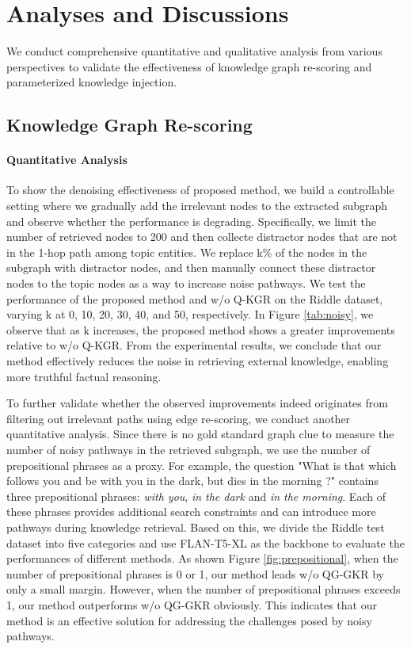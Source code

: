 \documentclass[11pt]{article}
\begin{document}
\section{Analyses and Discussions}
We conduct comprehensive quantitative and qualitative analysis from various perspectives to validate the effectiveness of knowledge graph re-scoring and parameterized knowledge injection.

\subsection{Knowledge Graph Re-scoring}
\paragraph{Quantitative Analysis}

To show the denoising effectiveness of proposed method, we build a controllable setting where we gradually add the irrelevant nodes to the extracted subgraph and observe whether the performance is degrading.
Specifically, we limit the number of retrieved nodes to 200 and then collecte distractor nodes that are not in the 1-hop path among topic entities. 
We replace k\% of the nodes in the subgraph with distractor nodes, and then manually connect these distractor nodes to the topic nodes as a way to increase noise pathways. 
We test the performance of the proposed method and w/o Q-KGR on the Riddle dataset, varying k at 0, 10, 20, 30, 40, and 50, respectively. 
In Figure \ref{tab:noisy}, we observe that as k increases, the proposed method shows a greater improvements relative to w/o Q-KGR.
From the experimental results, we conclude that our method effectively reduces the noise in retrieving external knowledge, enabling more truthful factual reasoning.

To further validate whether the observed improvements indeed originates from filtering out irrelevant paths using edge re-scoring, we conduct another quantitative analysis.
Since there is no gold standard graph clue to measure the number of noisy pathways in the retrieved subgraph, we use the number of prepositional phrases as a proxy. 
For example, the question "What is that which follows you and be with you in the dark, but dies in the morning ?" contains three prepositional phrases: \textit{with you}, \textit{in the dark} and \textit{in the morning}. 
Each of these phrases provides additional search constraints and can introduce more pathways during knowledge retrieval.
Based on this, we divide the Riddle test dataset into five categories and use FLAN-T5-XL as the backbone to evaluate the performances of different methods. 
As shown Figure \ref{fig:prepositional}, when the number of prepositional phrases is 0 or 1, our method leads w/o QG-GKR by only a small margin. 
However, when the number of prepositional phrases exceeds 1, our method outperforms w/o QG-GKR obviously. 
This indicates that our method is an effective solution for addressing the challenges posed by noisy pathways.
\end{document}
